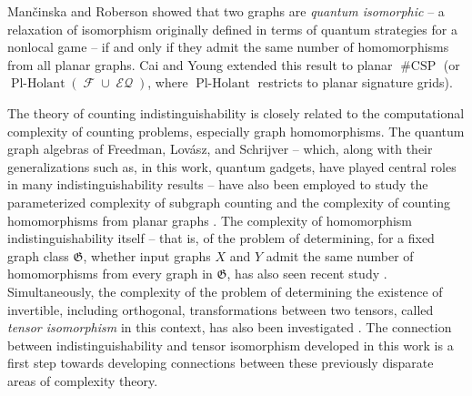 \documentclass{article}
\DeclareMathOperator{\fc}{\mathcal{F}}
\DeclareMathOperator{\plholant}{Pl-Holant}
\DeclareMathOperator{\csp}{\#CSP}
\DeclareMathOperator{\eq}{\mathcal{EQ}}
\begin{document}
Man\v{c}inska and Roberson \cite{planar} 
showed that two graphs are \emph{quantum isomorphic} -- a relaxation of isomorphism originally
defined in terms of quantum strategies for a nonlocal game \cite{nonsignalling}
-- if and only if they admit the same number of homomorphisms from all planar graphs.
Cai and Young \cite{cai_planar_2023} extended this result to
planar $\csp$ (or $\plholant(\fc \cup \eq)$, where $\plholant$ restricts to planar signature grids). 

The theory of counting indistinguishability is closely related to the computational complexity
of counting problems, especially graph homomorphisms. The quantum graph algebras of Freedman,
Lovász, and Schrijver \cite{freedman_reflection} -- which, along with their generalizations 
such as, in this work, quantum gadgets, have played central roles in many indistinguishability
results \cite{lovasz,schrijver,planar,grohe_homomorphism_2022,cai_planar_2023}
-- have also been employed to study the parameterized complexity of subgraph counting
\cite{curticapean2017homomorphisms,curticapean2024count} and the complexity of counting
homomorphisms from planar graphs \cite{cai_planar_2026}. The complexity of homomorphism
indistinguishability itself -- that is, of the problem of determining, for a fixed graph
class $\mathfrak{G}$, whether input graphs $X$ and $Y$ admit the same number of homomorphisms
from every graph in $\mathfrak{G}$, has also seen recent study \cite{seppelt2024algorithmic}.
Simultaneously, the complexity of the problem of determining the existence of invertible, 
including orthogonal, transformations between two tensors, called \emph{tensor isomorphism}
in this context, has also been investigated \cite{complexity_isomorphism1,complexity_isomorphism3}. The connection between indistinguishability and tensor isomorphism developed in this 
work is a first step towards developing connections between 
these previously disparate areas of complexity theory.
\end{document}
